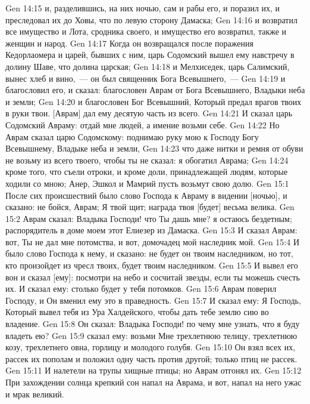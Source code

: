 \vs Gen 14:15 и, разделившись,  на них ночью, сам и рабы его, и поразил их, и преследовал их до Ховы, что по левую сторону Дамаска;
\vs Gen 14:16 и возвратил все имущество и Лота, сродника своего, и имущество его возвратил, также и женщин и народ.
\rsbpar\vs Gen 14:17 Когда он возвращался после поражения Кедорлаомера и царей, бывших с ним, царь Содомский вышел ему навстречу в долину Шаве, что  долина царская;
\vs Gen 14:18 и Мелхиседек, царь Салимский, вынес хлеб и вино,~--- он был священник Бога Всевышнего,~---
\vs Gen 14:19 и благословил его, и сказал: благословен Аврам от Бога Всевышнего, Владыки неба и земли;
\vs Gen 14:20 и благословен Бог Всевышний, Который предал врагов твоих в руки твои. [Аврам] дал ему десятую часть из всего.
\vs Gen 14:21 И сказал царь Содомский Авраму: отдай мне людей, а имение возьми себе.
\vs Gen 14:22 Но Аврам сказал царю Содомскому: поднимаю руку мою к Господу Богу Всевышнему, Владыке неба и земли,
\vs Gen 14:23 что даже нитки и ремня от обуви не возьму из всего твоего, чтобы ты не сказал: я обогатил Аврама;
\vs Gen 14:24 кроме того, что съели отроки, и кроме доли, принадлежащей людям, которые ходили со мною; Анер, Эшкол и Мамрий пусть возьмут свою долю.
\vs Gen 15:1 После сих происшествий было слово Господа к Авраму в видении [ночью], и сказано: не бойся, Аврам; Я твой щит; награда твоя [будет] весьма велика.
\vs Gen 15:2 Аврам сказал: Владыка Господи! что Ты дашь мне? я остаюсь бездетным; распорядитель в доме моем этот Елиезер из Дамаска.
\vs Gen 15:3 И сказал Аврам: вот, Ты не дал мне потомства, и вот, домочадец мой наследник мой.
\vs Gen 15:4 И было слово Господа к нему, и сказано: не будет он твоим наследником, но тот, кто произойдет из чресл твоих, будет твоим наследником.
\vs Gen 15:5 И вывел его вон и сказал [ему]: посмотри на небо и сосчитай звезды, если ты можешь счесть их. И сказал ему: столько будет у тебя потомков.
\vs Gen 15:6 Аврам поверил Господу, и Он вменил ему это в праведность.
\rsbpar\vs Gen 15:7 И сказал ему: Я Господь, Который вывел тебя из Ура Халдейского, чтобы дать тебе землю сию во владение.
\vs Gen 15:8 Он сказал: Владыка Господи! по чему мне узнать, что я буду владеть ею?
\vs Gen 15:9  сказал ему: возьми Мне трехлетнюю телицу, трехлетнюю козу, трехлетнего овна, горлицу и молодого голубя.
\vs Gen 15:10 Он взял всех их, рассек их пополам и положил одну часть против другой; только птиц не рассек.
\vs Gen 15:11 И налетели на трупы хищные птицы; но Аврам отгонял их.
\rsbpar\vs Gen 15:12 При захождении солнца крепкий сон напал на Аврама, и вот, напал на него ужас и мрак великий.
